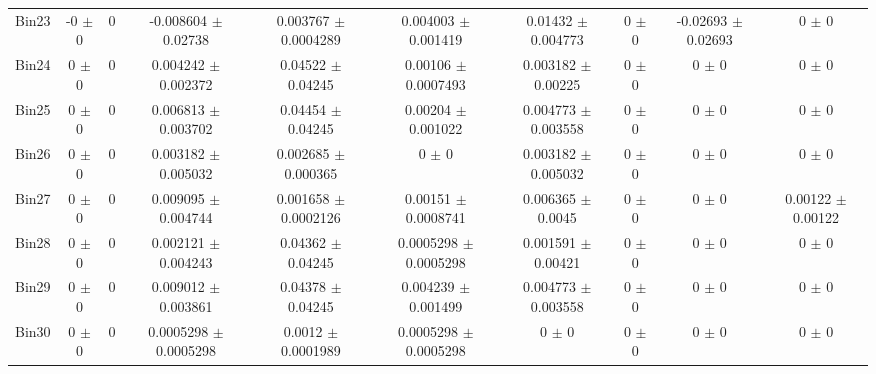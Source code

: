\begin{tabular}{@{\extracolsep{4pt}}lccccccccc@{}}
     Bin23 & -0 $\pm$ 0 & 0 & -0.008604 $\pm$ 0.02738 & 0.003767 $\pm$ 0.0004289 & 0.004003 $\pm$ 0.001419 & 0.01432 $\pm$ 0.004773 & 0 $\pm$ 0 & -0.02693 $\pm$ 0.02693 & 0 $\pm$ 0 \\ 
     Bin24 & 0 $\pm$ 0 & 0 & 0.004242 $\pm$ 0.002372 & 0.04522 $\pm$ 0.04245 & 0.00106 $\pm$ 0.0007493 & 0.003182 $\pm$ 0.00225 & 0 $\pm$ 0 & 0 $\pm$ 0 & 0 $\pm$ 0 \\ 
     Bin25 & 0 $\pm$ 0 & 0 & 0.006813 $\pm$ 0.003702 & 0.04454 $\pm$ 0.04245 & 0.00204 $\pm$ 0.001022 & 0.004773 $\pm$ 0.003558 & 0 $\pm$ 0 & 0 $\pm$ 0 & 0 $\pm$ 0 \\ 
     Bin26 & 0 $\pm$ 0 & 0 & 0.003182 $\pm$ 0.005032 & 0.002685 $\pm$ 0.000365 & 0 $\pm$ 0 & 0.003182 $\pm$ 0.005032 & 0 $\pm$ 0 & 0 $\pm$ 0 & 0 $\pm$ 0 \\ 
     Bin27 & 0 $\pm$ 0 & 0 & 0.009095 $\pm$ 0.004744 & 0.001658 $\pm$ 0.0002126 & 0.00151 $\pm$ 0.0008741 & 0.006365 $\pm$ 0.0045 & 0 $\pm$ 0 & 0 $\pm$ 0 & 0.00122 $\pm$ 0.00122 \\ 
     Bin28 & 0 $\pm$ 0 & 0 & 0.002121 $\pm$ 0.004243 & 0.04362 $\pm$ 0.04245 & 0.0005298 $\pm$ 0.0005298 & 0.001591 $\pm$ 0.00421 & 0 $\pm$ 0 & 0 $\pm$ 0 & 0 $\pm$ 0 \\ 
     Bin29 & 0 $\pm$ 0 & 0 & 0.009012 $\pm$ 0.003861 & 0.04378 $\pm$ 0.04245 & 0.004239 $\pm$ 0.001499 & 0.004773 $\pm$ 0.003558 & 0 $\pm$ 0 & 0 $\pm$ 0 & 0 $\pm$ 0 \\ 
     Bin30 & 0 $\pm$ 0 & 0 & 0.0005298 $\pm$ 0.0005298 & 0.0012 $\pm$ 0.0001989 & 0.0005298 $\pm$ 0.0005298 & 0 $\pm$ 0 & 0 $\pm$ 0 & 0 $\pm$ 0 & 0 $\pm$ 0 \\ 
\hline\hline
  \end{tabular}
